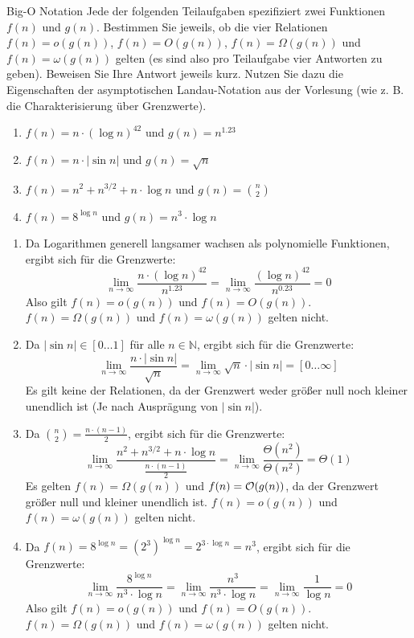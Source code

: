\documentclass{article}
\begin{document}
\begin{exercise}{Big-O Notation}
  Jede der folgenden Teilaufgaben spezifiziert zwei Funktionen $f(n)$ und $g(n)$. Bestimmen Sie jeweils, ob die vier Relationen $f(n) = o(g(n))$, $f(n) = O(g(n))$, $f(n) = \Omega(g(n))$ und $f(n) = \omega(g(n))$ gelten (es sind also pro Teilaufgabe vier Antworten zu geben). Beweisen Sie Ihre Antwort jeweils kurz. Nutzen Sie dazu die Eigenschaften der asymptotischen Landau-Notation aus der Vorlesung (wie z. B. die Charakterisierung über Grenzwerte).
  \begin{enumerate}
    \item $f(n) = n \cdot (\log n)^{42}$ und $g(n) = n^{1.23}$
    \item $f(n) = n \cdot |\sin n|$ und $g(n) = \sqrt{n}$
    \item $f(n) = n^2 + n^{3/2} + n \cdot \log n$ und $g(n) = \binom{n}{2}$
    \item $f(n) = 8^{\log n}$ und $g(n) = n^3 \cdot \log n$
  \end{enumerate}

  \begin{solution}
    \begin{enumerate}
      \item Da Logarithmen generell langsamer wachsen als polynomielle Funktionen, ergibt sich für die Grenzwerte: \[
              \lim_{n \to \infty} \frac{n \cdot (\log n)^{42}}{n^{1.23}} = \lim_{n \to \infty} \frac{(\log n)^{42}}{n^{0.23}} = 0
            \]
            Also gilt $f(n) = o(g(n))$ und $f(n) = O(g(n))$. $f(n) = \Omega(g(n))$ und $f(n) = \omega(g(n))$ gelten nicht.
      \item Da $|\sin n| \in [0\dots1]$ für alle $n \in \mathbb{N}$, ergibt sich für die Grenzwerte: \[
              \lim_{n \to \infty} \frac{n \cdot |\sin n|}{\sqrt{n}} = \lim_{n \to \infty} \sqrt{n} \cdot |\sin n| = [0\dots\infty]
            \]
            Es gilt keine der Relationen, da der Grenzwert weder größer null noch kleiner unendlich ist (Je nach Ausprägung von $|\sin n|$).
      \item Da $\binom{n}{2} = \frac{n \cdot (n-1)}{2}$, ergibt sich für die Grenzwerte: \[
              \lim_{n \to \infty} \frac{n^2 + n^{3/2} + n \cdot \log n}{\frac{n \cdot (n-1)}{2}} = \lim_{n \to \infty} \frac{\Theta(n^2)}{\Theta(n^2)} = \Theta(1)
            \]
            Es gelten $f(n) = \Omega(g(n))$ und $f(n) = \mathcal{O}(g(n))$, da der Grenzwert größer null und kleiner unendlich ist. $f(n) = o(g(n))$ und $f(n) = \omega(g(n))$ gelten nicht.
      \item Da $f(n) = 8^{\log n} = (2^3)^{\log n} = 2^{3 \cdot \log n} = n^3$, ergibt sich für die Grenzwerte: \[
              \lim_{n \to \infty} \frac{8^{\log n}}{n^3 \cdot \log n} = \lim_{n \to \infty} \frac{n^3}{n^3 \cdot \log n} = \lim_{n \to \infty} \frac{1}{\log n} = 0
            \]
            Also gilt $f(n) = o(g(n))$ und $f(n) = O(g(n))$. $f(n) = \Omega(g(n))$ und $f(n) = \omega(g(n))$ gelten nicht.
    \end{enumerate}
  \end{solution}
\end{exercise}
\end{document}
